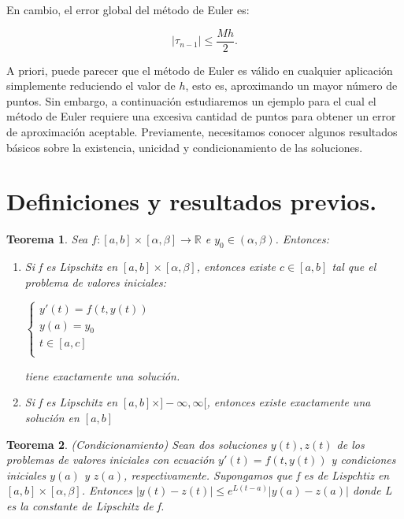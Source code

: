 \documentclass{article}
\theoremstyle{theorem-style}  %
\newtheorem{theorem}{Teorema}[section]  %
\theoremstyle{definition}
\theoremstyle{example-style}
\begin{document}
	En cambio, el error global del método de Euler es:
	
				\begin{equation}
				\label{0.2}
				|\tau_{n-1}| \le\dfrac{Mh}{2}.
				\end{equation}
				
	A priori, puede parecer que el método de Euler es válido en cualquier aplicación simplemente reduciendo el valor de $h$, esto es, aproximando un mayor número de puntos. Sin embargo, a continuación estudiaremos un ejemplo para el cual el método de Euler requiere una excesiva cantidad de puntos para obtener un error de aproximación aceptable. Previamente, necesitamos conocer algunos resultados básicos sobre la existencia, unicidad y condicionamiento de las soluciones.
	
\section{Definiciones y resultados previos.}
	
	\begin{theorem}
		Sea $f: [a,b]\times[\alpha,\beta] \rightarrow \mathbb{R}$ e $y_0 \in (\alpha,\beta)$. Entonces:
		\begin{enumerate}
			\item Si f es Lipschitz en $[a,b]\times[\alpha,\beta]$, entonces existe $c \in [a,b]$ tal que el problema de valores iniciales:
			\begin{center}
				$\begin{cases}
				y'(t) = f(t,y(t)) \\
				y(a) = y_0 \\
				t \in [a,c] \\
				\end{cases}$
			\end{center}
			tiene exactamente una solución. 
			\item Si f es Lipschitz en $[a,b]\times]-\infty,\infty[$, entonces existe exactamente una solución en $[a,b]$	
		\end{enumerate}
	\end{theorem}
	
	\begin{theorem}
		(Condicionamiento) Sean dos soluciones $y(t), z(t)$ de los problemas de valores iniciales con ecuación $y'(t) = f(t,y(t))$ y condiciones iniciales $y(a)$ y $z(a)$, respectivamente. Supongamos que f es de Lispchtiz en $[a,b]\times[\alpha,\beta]$. Entonces $|y(t)-z(t)| \leq e^{L(t-a)}|y(a)-z(a)|$ donde L es la constante de Lipschitz de f.
	\end{theorem}
	
\end{document}
